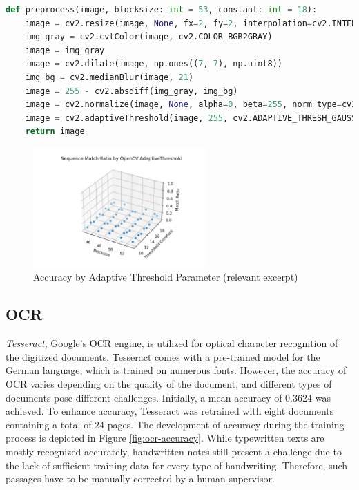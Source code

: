 \documentclass[12pt]{article}
\begin{document}
\begin{lstlisting}[language=Python, label=lst:img-preprocessing, caption={OpenCV image processing}, float, floatplacement=H]
def preprocess(image, blocksize: int = 53, constant: int = 18):
    image = cv2.resize(image, None, fx=2, fy=2, interpolation=cv2.INTER_LINEAR)
    img_gray = cv2.cvtColor(image, cv2.COLOR_BGR2GRAY)
    image = img_gray
    image = cv2.dilate(image, np.ones((7, 7), np.uint8))
    img_bg = cv2.medianBlur(image, 21)
    image = 255 - cv2.absdiff(img_gray, img_bg)
    image = cv2.normalize(image, None, alpha=0, beta=255, norm_type=cv2.NORM_MINMAX, dtype=cv2.CV_8UC1)
    image = cv2.adaptiveThreshold(image, 255, cv2.ADAPTIVE_THRESH_GAUSSIAN_C, cv2.THRESH_BINARY, blocksize, constant)
    return image
\end{lstlisting}

\begin{figure}[ht]
    \centering
    \includegraphics[width=250px]{opencv-adaptive-th.png}
    \caption{Accuracy by Adaptive Threshold Parameter (relevant excerpt)}
    \label{fig:test-bsc}
\end{figure}

\subsection{OCR}
\label{ssec:ocr}

\textit{Tesseract}, Google's OCR engine, is utilized for optical character recognition of the digitized documents. Tesseract comes with a pre-trained model for the German language, which is trained on numerous fonts. However, the accuracy of OCR varies depending on the quality of the document, and different types of documents pose different challenges. Initially, a mean accuracy of 0.3624 was achieved. To enhance accuracy, Tesseract was retrained with eight documents containing a total of 24 pages. The development of accuracy during the training process is depicted in Figure \ref{fig:ocr-accuracy}. While typewritten texts are mostly recognized accurately, handwritten notes still present a challenge due to the lack of sufficient training data for every type of handwriting. Therefore, such passages have to be manually corrected by a human supervisor.
\end{document}
